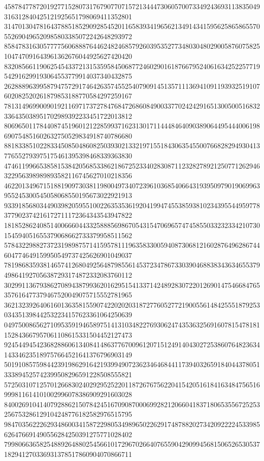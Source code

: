 \begin{DoxyCode}
      458784778720192771528073176790770715721344473060570073349243693113835049316312840425121925651798069411352801
      314701304781643788518529092854520116583934196562134914341595625865865570552690496520985803385072242648293972
      858478316305777756068887644624824685792603953527734803048029005876075825104747091643961362676044925627420420
      832085661190625454337213153595845068772460290161876679524061634252257719542916299193064553779914037340432875
      262888963995879475729174642635745525407909145135711136941091193932519107602082520261879853188770584297259167
      781314969900901921169717372784768472686084900337702424291651300500516832336435038951702989392233451722013812
      806965011784408745196012122859937162313017114448464090389064495444006198690754851602632750529834918740786680
      881833851022833450850486082503930213321971551843063545500766828294930413776552793975175461395398468339363830
      474611996653858153842056853386218672523340283087112328278921250771262946322956398989893582116745627010218356
      462201349671518819097303811980049734072396103685406643193950979019069963955245300545058068550195673022921913
      933918568034490398205955100226353536192041994745538593810234395544959778377902374216172711172364343543947822
      181852862408514006660443325888569867054315470696574745855033232334210730154594051655379068662733379958511562
      578432298827372319898757141595781119635833005940873068121602876496286744604774649159950549737425626901049037
      781986835938146574126804925648798556145372347867330390468838343634655379498641927056387293174872332083760112
      302991136793862708943879936201629515413371424892830722012690147546684765357616477379467520049075715552781965
      362132392640616013635815590742202020318727760527721900556148425551879253034351398442532234157623361064250639
      049750086562710953591946589751413103482276930624743536325691607815478181152843667957061108615331504452127473
      924544945423682886061340841486377670096120715124914043027253860764823634143346235189757664521641376796903149
      501910857598442391986291642193994907236234646844117394032659184044378051333894525742399508296591228508555821
      572503107125701266830240292952522011872676756220415420516184163484756516999811614101002996078386909291603028
      840026910414079288621507842451670908700069928212066041837180653556725253256753286129104248776182582976515795
      984703562226293486003415872298053498965022629174878820273420922224533985626476691490556284250391275771028402
      799806636582548892648802545661017296702664076559042909945681506526530537182941270336931378517860904070866711

\end{DoxyCode}
